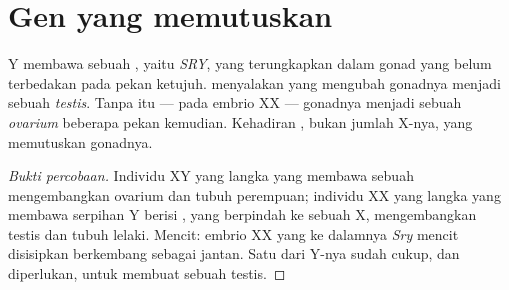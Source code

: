 \section{Gen yang memutuskan}

\begin{proposition}\label{prop:g11:becoming-male-female:sry}
 Y membawa sebuah , yaitu \emph{SRY}, yang
terungkapkan dalam gonad yang belum terbedakan pada pekan ketujuh.
 menyalakan  yang mengubah gonadnya menjadi sebuah
\emph{testis}. Tanpa  itu --- pada embrio XX --- gonadnya menjadi
sebuah \emph{ovarium} beberapa pekan kemudian. Kehadiran , bukan
jumlah  X-nya, yang memutuskan gonadnya.
\end{proposition}
\begin{proof}[Bukti percobaan]
Individu XY yang langka yang  membawa sebuah 
mengembangkan ovarium dan tubuh perempuan; individu XX yang langka yang
membawa serpihan Y berisi , yang berpindah ke sebuah X,
mengembangkan testis dan tubuh lelaki. Mencit: embrio XX yang ke
dalamnya  \emph{Sry} mencit disisipkan berkembang sebagai jantan.
Satu  dari Y-nya sudah cukup, dan diperlukan, untuk membuat sebuah testis.
\end{proof}

